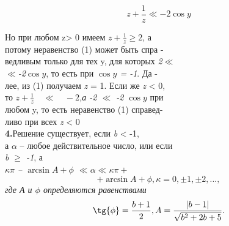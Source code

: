 \begin{minipage}[b]{0.40\textwidth}
	\begin{equation}
		 z+\frac{1}{z}\ll -2\cos{y} 
	\end{equation}

	Но при любом z> 0 имеем \textit{$ z+\frac{1}{z}\geq 2$}, а\\
	потому неравенство (1)   может  быть спра -\\
	ведливым только для тех y, для которых \textit{2$\ll$ \\
	$\ll$-2\quad$\cos{y}$}, то есть при \textit{$\cos{y}$ = -1}. Да - \\
	лее, из (1) получаем \textit{z} = 1. Если же \textit{z} < 0,\\
	то  \textit{$ z+\frac{1}{z}\quad \ll \quad -2$,\quad а -2 $\ll$ -2 $\cos{y}$} при\\
	любом y, то есть неравенство (1) справед-\\
	ливо при всех \textit{z} < 0\\
	\hphantom \qquad \textbf{4.}Решение существует, если \textit{b} < -1,\\
	а \textit{$\alpha$} -- любое действительное число, или если\\
	\textit{b $\geq$ -1}, а\\

	\textit{$\kappa \pi$ -- $\arcsin{A+\phi}$ $\ll \alpha\ll\kappa \pi+$} 
	\begin{equation}
		+ \arcsin{A + \phi}, \kappa = 0, \pm 1, \pm 2, ...,
	\end{equation}
	\textit{где А и $\phi$ определяются равенствами}
	\begin{equation}
		 \tg{\phi} = \frac{b+1}{2}, A = \frac{|b - 1|}{\sqrt{b^2+2b+5}}.
	\end{equation}
		
\end{minipage}
